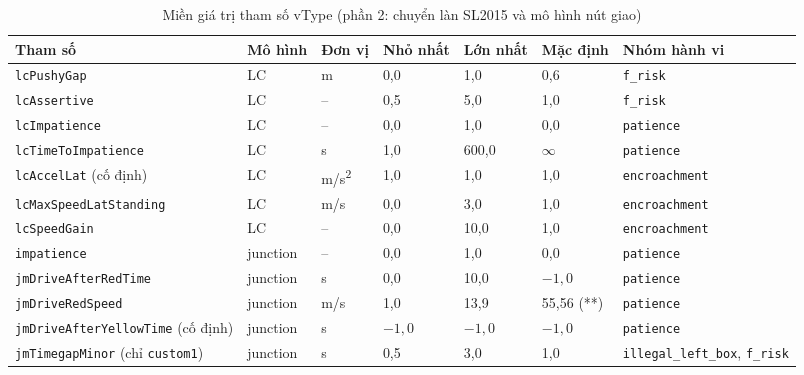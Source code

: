\documentclass[../main.tex]{subfiles}
\begin{document}
\begin{table}[!htbp]
\centering
\small\setlength{\tabcolsep}{3pt}
\caption{Miền giá trị tham số vType (phần 2: chuyển làn SL2015 và mô hình nút giao)}
\label{table:appendix_bounds_2}
\begin{tabular}{|p{3.0cm}|p{1.7cm}|p{1.15cm}|p{1.1cm}|p{1.1cm}|p{1.5cm}|p{3.1cm}|}
\hline
\textbf{Tham số} & \textbf{Mô hình} & \textbf{Đơn vị} & \textbf{Nhỏ nhất} & \textbf{Lớn nhất} & \textbf{Mặc định} & \textbf{Nhóm hành vi} \\ \hline
\texttt{lcPushyGap} & LC & m & 0,0 & 1,0 & 0,6 & \texttt{f\_\allowbreak risk} \\ \hline
\texttt{lcAssertive} & LC & -- & 0,5 & 5,0 & 1,0 & \texttt{f\_\allowbreak risk} \\ \hline
\texttt{lcImpatience} & LC & -- & 0,0 & 1,0 & 0,0 & \texttt{patience} \\ \hline
\texttt{lcTimeTo\allowbreak Impatience} & LC & s & 1,0 & 600,0 & $\infty$ & \texttt{patience} \\ \hline
\texttt{lcAccelLat} (cố định) & LC & m/s\textsuperscript{2} & 1,0 & 1,0 & 1,0 & \texttt{encroachment} \\ \hline
\texttt{lcMaxSpeed\allowbreak LatStanding} & LC & m/s & 0,0 & 3,0 & 1,0 & \texttt{encroachment} \\ \hline
\texttt{lcSpeedGain} & LC & -- & 0,0 & 10,0 & 1,0 & \texttt{encroachment} \\ \hline
\texttt{impatience} & junction & -- & 0,0 & 1,0 & 0,0 & \texttt{patience} \\ \hline
\texttt{jmDriveAfter\allowbreak RedTime} & junction & s & 0,0 & 10,0 & $-1{,}0$ & \texttt{patience} \\ \hline
\texttt{jmDriveRed\allowbreak Speed} & junction & m/s & 1,0 & 13,9 & 55,56 (**) & \texttt{patience} \\ \hline
\texttt{jmDriveAfter\allowbreak YellowTime} (cố định) & junction & s & $-1{,}0$ & $-1{,}0$ & $-1{,}0$ & \texttt{patience} \\ \hline
\texttt{jmTimegap\allowbreak Minor} (chỉ \texttt{custom1}) & junction & s & 0,5 & 3,0 & 1,0 & \texttt{illegal\_\allowbreak left\_\allowbreak box}, \texttt{f\_\allowbreak risk} \\ \hline
\end{tabular}
\end{table}
\end{document}
